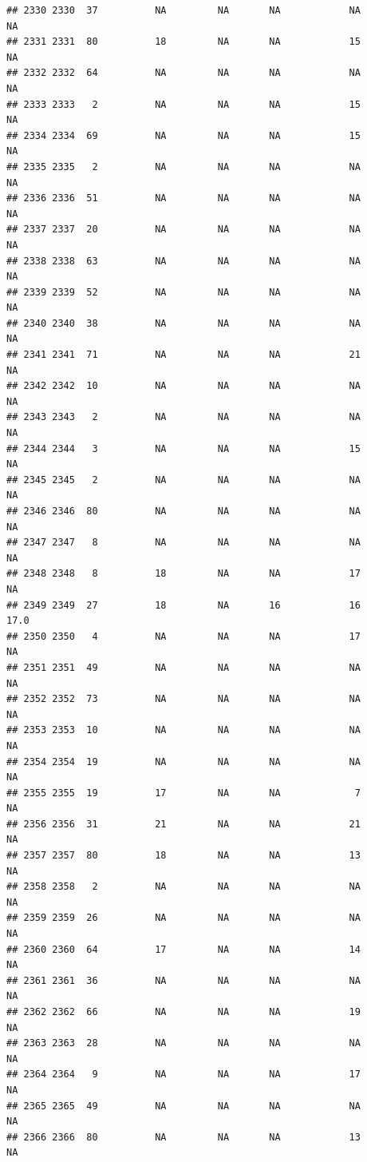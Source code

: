 \documentclass[man]{apa6}
\begin{document}
\begin{verbatim}
## 2330 2330  37          NA         NA       NA            NA       NA
## 2331 2331  80          18         NA       NA            15       NA
## 2332 2332  64          NA         NA       NA            NA       NA
## 2333 2333   2          NA         NA       NA            15       NA
## 2334 2334  69          NA         NA       NA            15       NA
## 2335 2335   2          NA         NA       NA            NA       NA
## 2336 2336  51          NA         NA       NA            NA       NA
## 2337 2337  20          NA         NA       NA            NA       NA
## 2338 2338  63          NA         NA       NA            NA       NA
## 2339 2339  52          NA         NA       NA            NA       NA
## 2340 2340  38          NA         NA       NA            NA       NA
## 2341 2341  71          NA         NA       NA            21       NA
## 2342 2342  10          NA         NA       NA            NA       NA
## 2343 2343   2          NA         NA       NA            NA       NA
## 2344 2344   3          NA         NA       NA            15       NA
## 2345 2345   2          NA         NA       NA            NA       NA
## 2346 2346  80          NA         NA       NA            NA       NA
## 2347 2347   8          NA         NA       NA            NA       NA
## 2348 2348   8          18         NA       NA            17       NA
## 2349 2349  27          18         NA       16            16     17.0
## 2350 2350   4          NA         NA       NA            17       NA
## 2351 2351  49          NA         NA       NA            NA       NA
## 2352 2352  73          NA         NA       NA            NA       NA
## 2353 2353  10          NA         NA       NA            NA       NA
## 2354 2354  19          NA         NA       NA            NA       NA
## 2355 2355  19          17         NA       NA             7       NA
## 2356 2356  31          21         NA       NA            21       NA
## 2357 2357  80          18         NA       NA            13       NA
## 2358 2358   2          NA         NA       NA            NA       NA
## 2359 2359  26          NA         NA       NA            NA       NA
## 2360 2360  64          17         NA       NA            14       NA
## 2361 2361  36          NA         NA       NA            NA       NA
## 2362 2362  66          NA         NA       NA            19       NA
## 2363 2363  28          NA         NA       NA            NA       NA
## 2364 2364   9          NA         NA       NA            17       NA
## 2365 2365  49          NA         NA       NA            NA       NA
## 2366 2366  80          NA         NA       NA            13       NA

\end{verbatim}
\end{document}
